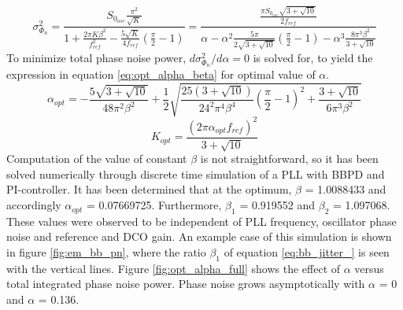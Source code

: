 	 	\begin{equation}\label{eq:total_pn_pow}
	 		\sigma^2_{\Phi_{n}} = \frac{S_{0_{osc}}\frac{\pi^2}{\sqrt{K}}}{1 + \frac{2\pi K \beta^2}{f_{ref}^2} - \frac{5\sqrt{K}}{4f_{ref}} \left(\frac{\pi}{2}-1\right)}  
	 		= \frac{\frac{\pi S_{0_{osc}}\sqrt{3+\sqrt{10}}}{2f_{ref}}}{\alpha - \alpha^2\frac{5\pi}{2\sqrt{3+\sqrt{10}}}\left(\frac{\pi}{2}-1\right) - \alpha^3 \frac{8\pi^3\beta^2}{3+\sqrt{10}}}
	 	\end{equation}
	To minimize total phase noise power, $d\sigma^2_{\Phi_{n}}/d\alpha = 0$ is solved for, to yield the expression in equation \ref{eq:opt_alpha_beta} for optimal value of $\alpha$.
	\begin{equation} \label{eq:opt_alpha_beta}
		\alpha_{opt} = -\frac{5\sqrt{3+\sqrt{10}}}{48\pi^2\beta^2}
		+ \frac{1}{2}\sqrt{ \frac{25(3+\sqrt{10})}{24^2\pi^4\beta^4}\left(\frac{\pi}{2}-1\right)^2 + \frac{3+\sqrt{10}}{6\pi^3\beta^2}} 
	\end{equation}
	\begin{equation}
		K_{opt} = \frac{(2\pi\alpha_{opt} f_{ref})^2}{3+\sqrt{10}}
	\end{equation}
	Computation of the value of constant $\beta$ is not straightforward, so it has been solved numerically through discrete time simulation of a PLL with BBPD and PI-controller. It has been determined that at the optimum, $\beta$ = 1.0088433 and accordingly $\alpha_{opt}$ = 0.07669725. Furthermore, $\beta_1$ = 0.919552 and $\beta_2$ = 1.097068. These values were observed to be independent of PLL frequency, oscillator phase noise and reference and DCO gain. An example case of this simulation is shown in figure \ref{fig:em_bb_pn}, where the ratio $\beta_1$ of equation \ref{eq:bb_jitter_} is seen with the vertical lines. Figure \ref{fig:opt_alpha_full} shows the effect of $\alpha$ versus total integrated phase noise power. Phase noise grows asymptotically with $\alpha$ = 0 and $\alpha$ = 0.136. 

